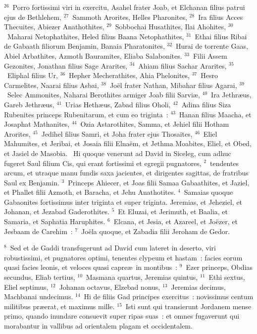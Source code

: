${}^{26}$~Porro fortissimi viri in exercitu, Asahel frater Joab, et Elchanan filius patrui ejus de Bethlehem,
${}^{27}$~Sammoth Arorites, Helles Pharonites,
${}^{28}$~Ira filius Acces Thecuites, Abiezer Anathothites,
${}^{29}$~Sobbochai Husathites, Ilai Ahohites,
${}^{30}$~Maharai Netophathites, Heled filius Baana Netophathites,
${}^{31}$~Ethai filius Ribai de Gabaath filiorum Benjamin, Banaia Pharatonites,
${}^{32}$~Hurai de torrente Gaas, Abiel Arbathites, Azmoth Bauramites, Eliaba Salabonites.
${}^{33}$~Filii Assem Gezonites, Jonathan filius Sage Ararites,
${}^{34}$~Ahiam filius Sachar Ararites,
${}^{35}$~Eliphal filius Ur,
${}^{36}$~Hepher Mecherathites, Ahia Phelonites,
${}^{37}$~Hesro Carmelites, Naarai filius Asbai,
${}^{38}$~Jo\"el frater Nathan, Mibahar filius Agarai,
${}^{39}$~Selec Ammonites, Naharai Berothites armiger Joab filii Sarvi\ae ,
${}^{40}$~Ira Jethr\ae us, Gareb Jethr\ae us,
${}^{41}$~Urias Heth\ae us, Zabad filius Oholi,
${}^{42}$~Adina filius Siza Rubenites princeps Rubenitarum, et cum eo triginta~:
${}^{43}$~Hanan filius Maacha, et Josaphat Mathanites,
${}^{44}$~Ozia Astarothites, Samma, et Jehiel filii Hotham Arorites,
${}^{45}$~Jedihel filius Samri, et Joha frater ejus Thosaites,
${}^{46}$~Eliel Mahumites, et Jeribai, et Josaia filii Elna\"em, et Jethma Moabites, Eliel, et Obed, et Jasiel de Masobia.
~\lettrine[lines=10,image=true,loversize=0.05,lraise=-0.03]{H}{}i quoque venerunt ad David in Siceleg, cum adhuc fugeret Saul filium Cis, qui erant fortissimi et egregii pugnatores,
${}^{2}$~tendentes arcum, et utraque manu fundis saxa jacientes, et dirigentes sagittas, de fratribus Saul ex Benjamin.
${}^{3}$~Princeps Ahiecer, et Joas filii Samaa Gabaathites, et Jaziel, et Phallet filii Azmoth, et Baracha, et Jehu Anathotites.
${}^{4}$~Samaias quoque Gabaonites fortissimus inter triginta et super triginta. Jeremias, et Jeheziel, et Johanan, et Jezabad Gaderothites.
${}^{5}$~Et Eluzai, et Jerimuth, et Baalia, et Samaria, et Saphatia Haruphites.
${}^{6}$~Elcana, et Jesia, et Azareel, et Jo\"ezer, et Jesbaam de Carehim~:
${}^{7}$~Jo\"ela quoque, et Zabadia filii Jeroham de Gedor.


${}^{8}$~Sed et de Gaddi transfugerunt ad David cum lateret in deserto, viri robustissimi, et pugnatores optimi, tenentes clypeum et hastam~: facies eorum quasi facies leonis, et veloces quasi capre\ae\ in montibus~:
${}^{9}$~Ezer princeps, Obdias secundus, Eliab tertius,
${}^{10}$~Masmana quartus, Jeremias quintus,
${}^{11}$~Ethi sextus, Eliel septimus,
${}^{12}$~Johanan octavus, Elzebad nonus,
${}^{13}$~Jeremias decimus, Machbanai undecimus.
${}^{14}$~Hi de filiis Gad principes exercitus~: novissimus centum militibus pr\ae erat, et maximus mille.
${}^{15}$~Isti sunt qui transierunt Jordanem mense primo, quando inundare consuevit super ripas suas~: et omnes fugaverunt qui morabantur in vallibus ad orientalem plagam et occidentalem.


